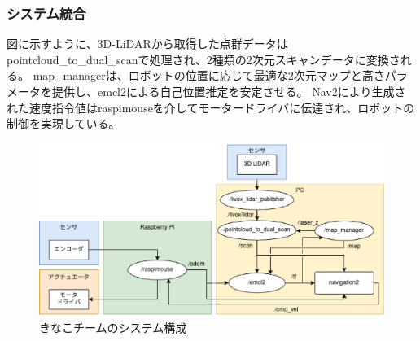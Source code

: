 \subsubsection{システム統合}
図に示すように、3D-LiDARから取得した点群データはpointcloud\_to\_dual\_scanで処理され、2種類の2次元スキャンデータに変換される。
map\_managerは、ロボットの位置に応じて最適な2次元マップと高さパラメータを提供し、emcl2による自己位置推定を安定させる。
Nav2により生成された速度指令値はraspimouseを介してモータードライバに伝達され、ロボットの制御を実現している。

\begin{figure}[h]
  \begin{center}
    \includegraphics[width=1.0\linewidth]{figs/kinako_system.eps}
    \caption{きなこチームのシステム構成}
    \label{fig:mugimaru_system}
  \end{center}
\end{figure}
